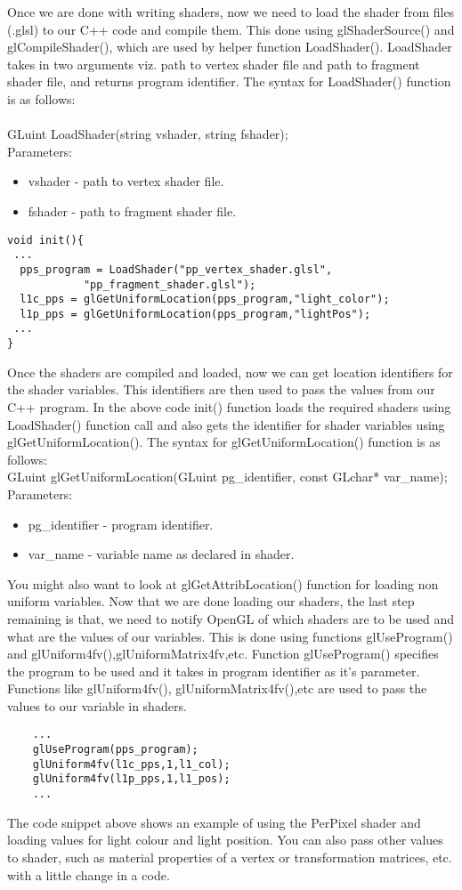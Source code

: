\documentclass[11pt]{article}
\begin{document}
Once we are done with writing shaders, now we need to load the shader from files (.glsl) to our C++ code and compile them. This done using glShaderSource() and glCompileShader(), which are used by helper function LoadShader(). LoadShader takes in two arguments viz. path to vertex shader file and path to fragment shader file, and returns program identifier. The syntax for LoadShader() function is as follows:\\\\
GLuint LoadShader(string vshader, string fshader);\\
Parameters:
\begin{itemize}
\item vshader - path to vertex shader file.
\item fshader - path to fragment shader file.
\end{itemize}


\begin{lstlisting}
void init(){
 ...
  pps_program = LoadShader("pp_vertex_shader.glsl",
   			"pp_fragment_shader.glsl");
  l1c_pps = glGetUniformLocation(pps_program,"light_color");
  l1p_pps = glGetUniformLocation(pps_program,"lightPos");
 ...
}
\end{lstlisting}

Once the shaders are compiled and loaded, now we can get location identifiers for the shader variables. This identifiers are then used to pass the values from our C++ program. In the above code init() function loads the required shaders using LoadShader() function call and also gets the identifier for shader variables using glGetUniformLocation(). The syntax for glGetUniformLocation() function is as follows:\\
GLuint glGetUniformLocation(GLuint pg\_identifier, const GLchar* var\_name);
\\
Parameters:
\begin{itemize}
\item pg\_identifier - program identifier.
\item var\_name - variable name as declared in shader. 
\end{itemize}

You might also want to look at glGetAttribLocation() function for loading non uniform variables. Now that we are done loading our shaders, the last step remaining is that, we need to notify OpenGL of which shaders are to be used and what are the values of our variables. This is done using functions glUseProgram() and glUniform4fv(),glUniformMatrix4fv,etc. Function glUseProgram() specifies the program to be used and it takes in program identifier as it's parameter. Functions like glUniform4fv(), glUniformMatrix4fv(),etc are used to pass the values to our variable in shaders.

\begin{lstlisting}
    ...
    glUseProgram(pps_program);
    glUniform4fv(l1c_pps,1,l1_col);
    glUniform4fv(l1p_pps,1,l1_pos);
    ...
\end{lstlisting}

The code snippet above shows an example of using the PerPixel shader and loading values for light colour and light position. You can also pass other values to shader, such as material properties of a vertex or transformation matrices, etc. with a little change in a code.  
\end{document}
